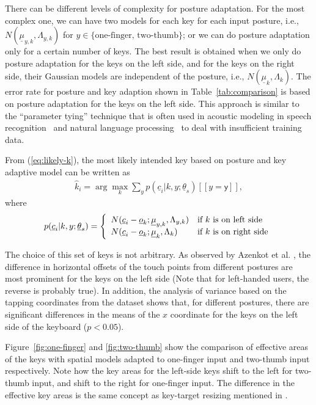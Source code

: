 \documentclass{sigchi}
\begin{document}
There can be different levels of complexity for posture adaptation. For the most complex one, we can have
two models for each key for each input posture, i.e., $N(\underline \mu_{y,k}, \Lambda_{y,k})$ for $y \in
\{\text{one-finger, two-thumb}\}$; or we can do posture adaptation only for a certain
number of keys. The best result is obtained when we only do posture adaptation for the keys on 
the left side, and for the keys on the right side, their Gaussian models are
independent of the posture, i.e., $N(\underline\mu_k, \Lambda_k)$.
The error rate for posture and key adaption shown in Table~\ref{tab:comparison} is based on 
posture adaptation for the keys on the left side. This approach is similar to the ``parameter tying'' technique that is often used in acoustic modeling in speech recognition~\cite{Bellegarda:1989} and natural language processing~\cite{Lin:1995} to deal with insufficient training data.

From (\ref{eq:likely-k}), the most likely intended key based on posture and key adaptive model can be written as
\begin{align}          
\hat k_i = \arg\max_k \sum_{y} p(\underline c_i | k, y; \underline\theta_s)[[y = \textsf{y}]],
\end{align}
where
\begin{align}
p(\underline c_i | k, y; \underline\theta_s) = \left\{
  \begin{array}{l l}
  N(\underline c_i - \underline o_k; \underline \mu_{y, k}, \Lambda_{y,k}) & \text{if $k$ is on left side} \\
  N(\underline c_i - \underline o_k; \underline \mu_{k}, \Lambda_{k}) & \text{if $k$ is on right side} \\
\end{array} \right.
\end{align}

The choice of this set of keys is not arbitrary. As observed by Azenkot et al. \cite{Azenkot:2012}, the difference in horizontal
offsets of the touch points from different postures are most prominent for the keys on the
left side (Note that for left-handed users, the reverse is probably true). 
In addition, the analysis of variance based on the tapping coordinates from the
dataset shows that, for different postures, there are significant differences in the means of
the $x$ coordinate for the keys on the left side of the keyboard ($p < 0.05$). 

Figure~\ref{fig:one-finger} and \ref{fig:two-thumb} show the comparison of effective areas of the keys
with spatial models adapted to one-finger input and two-thumb input respectively. Note how the key areas for the left-side keys shift to the left
for two-thumb input, and shift to the right for one-finger input. The difference in 
the effective key areas is the same concept as key-target resizing mentioned in \cite{Gunawardana:2010, Rudchenko:2011}.
\end{document}
